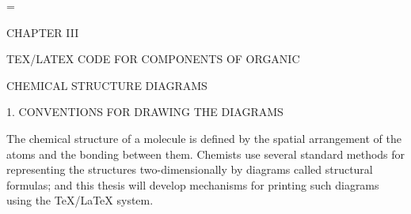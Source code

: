 
  \nofiles                          
  \def\LATEX{\LaTeX}
  \let\TEX = \TeX               
  \setcounter{totalnumber}{4}   
  \setcounter{topnumber}{2}     
  \setcounter{bottomnumber}{2}
  \renewcommand{\topfraction}{.5}
  \renewcommand{\bottomfraction}{.5}
  \setlength{\oddsidemargin}{3.9cm}     %
  \setlength{\textwidth}{5.7in}         %
  \setlength{\topmargin}{1cm}
  \setlength{\headheight}{.6cm}
  \setlength{\textheight}{8.5in}
  \setlength{\parindent}{1cm}
  \renewcommand{\baselinestretch}{1.5}
  \raggedbottom
  
  
  
  
  
  
  
  
  
  
      
  \setcounter{page}{11}
  =\tenrm
  \initial
  \setcounter{chapter}{3}
 
 \centerline{CHAPTER III}
 \vspace{0.4cm}
 \centerline{TEX/LATEX CODE FOR COMPONENTS OF ORGANIC}
 \centerline{CHEMICAL STRUCTURE DIAGRAMS}
 \vspace{0.4cm}
 \centerline{1. CONVENTIONS FOR DRAWING THE DIAGRAMS}
 \vspace{0.4cm}

 The chemical structure of a molecule is defined by the spatial
 arrangement of the atoms and the bonding between them.
 Chemists use several standard methods for representing the
 structures two-dimensionally by diagrams called structural
 formulas; and this thesis will develop mechanisms for printing
 such diagrams using the TeX/LaTeX system.

